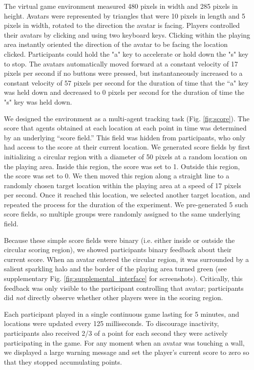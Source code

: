 \documentclass[12pt,letterpaper]{article}
\begin{document}
The virtual game environment measured 480 pixels in width and 285 pixels in height.
Avatars were represented by triangles that were 10 pixels in length and 5 pixels in width, rotated to the direction the avatar is facing. 
Players controlled their avatars by clicking and using two keyboard keys. 
Clicking within the playing area instantly oriented the direction of the avatar to be facing the location clicked. 
Participants could hold the "a" key to accelerate or hold down the "s" key to stop.  
The avatars automatically moved forward at a constant velocity of 17 pixels per second if no buttons were pressed, but instantaneously increased to a constant velocity of 57 pixels per second for the duration of time that the ``a" key was held down and decreased to 0 pixels per second for the duration of time the "s" key was held down. 

We designed the environment as a multi-agent tracking task (Fig. \ref{fig:score}).
The score that agents obtained at each location at each point in time was determined by an underlying ``score field.'' 
This field was hidden from participants, who only had access to the score at their current location. 
We generated score fields by first initializing a circular region with a diameter of 50 pixels at a random location on the playing area. 
Inside this region, the score was set to 1.
Outside this region, the score was set to 0.
We then moved this region along a straight line to a randomly chosen target location within the playing area at a speed of 17 pixels per second.
Once it reached this location, we selected another target location, and repeated the process for the duration of the experiment.
We pre-generated 5 such score fields, so multiple groups were randomly assigned to the same underlying field.  

Because these simple score fields were binary (i.e. either inside or outside the circular scoring region), we showed participants binary feedback about their current score.
When an avatar entered the circular region, it was surrounded by a salient sparkling halo and the border of the playing area turned green (see supplementary Fig. \ref{fig:supplemental_interface} for screenshots). 
Critically, this feedback was only visible to the participant controlling that avatar; participants did \emph{not} directly observe whether other players were in the scoring region.

Each participant played in a single
continuous game lasting for 5 minutes, and locations were updated every 125 milliseconds. 
To discourage inactivity, participants also received 2/3 of a point for each second they were actively participating in the game.
For any moment when an avatar was touching a wall, we displayed a large warning message and set the player's current score to zero so that they stopped accumulating points.
\end{document}
